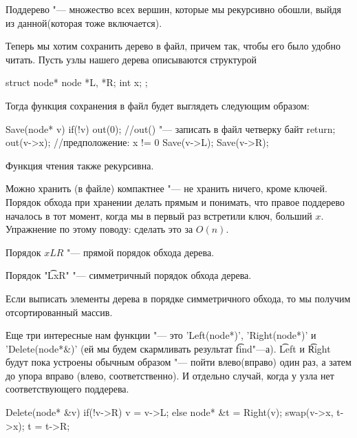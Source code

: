 \begin{Def}
	Поддерево "--- множество всех вершин, которые мы рекурсивно обошли, 
	выйдя из данной(которая тоже включается).
\end{Def}

Теперь мы хотим сохранить дерево в файл, причем так, чтобы его было удобно читать.
Пусть узлы нашего дерева описываются структурой
\begin{cppcode}
struct node* {
    node *L, *R;
    int x;
};
\end{cppcode}
Тогда функция сохранения в файл будет выглядеть следующим образом:
\begin{cppcode}
Save(node* v) {
    if(!v) {
        out(0); //out() "--- записать в файл четверку байт
        return;
    }
    out(v->x); //предположение: x != 0
    Save(v->L);
    Save(v->R);
}
\end{cppcode}
Функция чтения также рекурсивна.

Можно хранить (в файле) компактнее "--- не хранить ничего, кроме ключей. 
Порядок обхода при хранении делать прямым и понимать, что правое поддерево 
началось в тот момент, когда мы в первый раз встретили ключ, больший $x$.
Упражнение по этому поводу: сделать  это за $O(n)$.

\begin{Def}
	Порядок $xLR$ "--- прямой порядок обхода дерева.
	
	Порядок "\t{LxR}" "--- симметричный порядок обхода дерева.
\end{Def}

\begin{Rem}
	Если выписать элементы дерева в порядке симметричного обхода, 
	то мы получим отсортированный массив.
\end{Rem}

Еще три интересные нам функции "--- это \cpp'Left(node*)', \cpp'Right(node*)' и \cpp'Delete(node*&)'
(ей мы будем скармливать результат \t{find}"---а). 
\t{Left} и \t{Right} будут пока устроены обычным образом "--- 
пойти влево(вправо) один раз, а затем до упора вправо (влево, соответственно). 
И отдельно случай, когда у узла нет соответствующего поддерева.

\begin{cppcode}
Delete(node* &v) {
	if(!v->R)
		v = v->L;
	else {
		node* &t = Right(v);
		swap(v->x, t->x);
		t = t->R;
	}
}
\end{cppcode}


